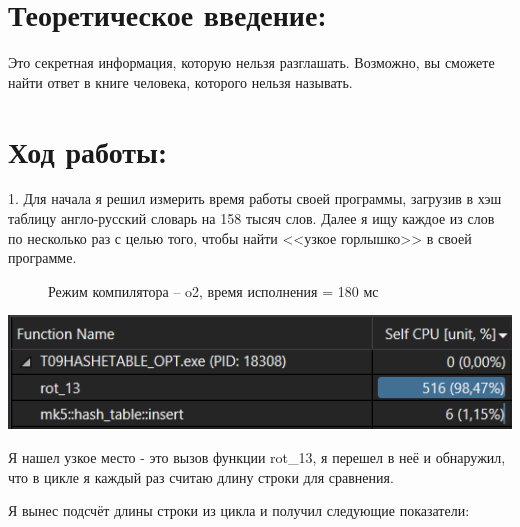 \documentclass[a4paper,12pt]{article}
\begin{document}
\section*{Теоретическое введение:}
Это секретная информация, которую нельзя разглашать.
Возможно, вы сможете найти ответ в книге человека, которого нельзя называть.

\section*{Ход работы:}
1. Для начала я решил измерить время работы своей программы, загрузив в хэш таблицу англо-русский словарь на 158 тысяч слов. Далее я ищу каждое из слов по несколько раз с целью того, чтобы найти <<узкое горлышко>> в своей программе.

\begin{center}
	\begin{figure}[h]
		\caption{Режим компилятора -- o2, время исполнения = 180 мс}
	\end{figure}
	\includegraphics[scale = 1]{1_test.png}
\end{center}

Я нашел узкое место - это вызов функции rot\_13, я перешел в неё и обнаружил, что в цикле я каждый раз считаю длину строки для сравнения.

Я вынес подсчёт длины строки из цикла и получил следующие показатели:
\end{document}
